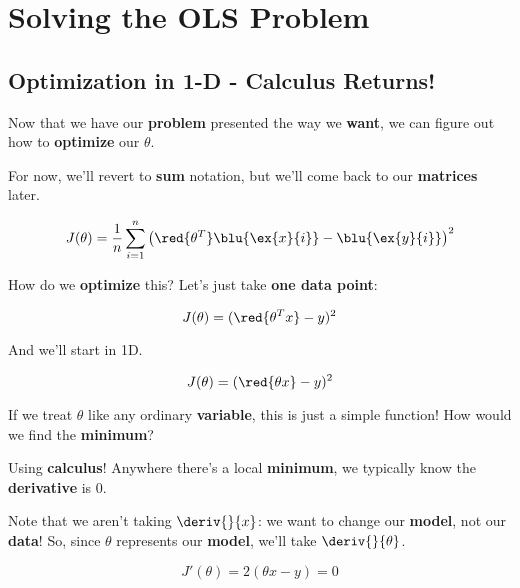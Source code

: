 
\section*{Solving the OLS Problem}

    \subsection*{Optimization in 1-D - Calculus Returns!}
    
        Now that we have our \textbf{problem} presented the way we \textbf{want}, we can figure out how to \textbf{optimize} our $\theta$.
        
        For now, we'll revert to \textbf{sum} notation, but we'll come back to our \textbf{matrices} later.
        
        \begin{equation}
            J(\theta) = 
            \frac{1}{n}  \sum_{i=1}^n 
            \left( \red{\theta^T} \blu{\ex{x}{i}}  
            - \blu{\ex{y}{i}} \right)^2 
        \end{equation}
        
        How do we \textbf{optimize} this? Let's just take \textbf{one data point}:
        
        \begin{equation}
            J(\theta) = (\red{ \theta^T x  } - y )^2
        \end{equation}
        
        And we'll start in 1D.
        
        \begin{equation}
            J(\theta) = (\red{\theta x}   - y )^2
        \end{equation}
        
        If we treat $\theta$ like any ordinary \textbf{variable}, this is just a simple function! How would we find the \textbf{minimum}? 
        
        Using \textbf{calculus}! Anywhere there's a local \textbf{minimum}, we typically know the \textbf{derivative} is 0.
        
        Note that we aren't taking $\deriv{}{x}$: we want to change our \textbf{model}, not our \textbf{data}! So, since $\theta$ represents our \textbf{model}, we'll take $\deriv{}{\theta}$.
        
        \begin{equation}
            J'(\theta) = 2(\theta x - y ) = 0
        \end{equation}
        
